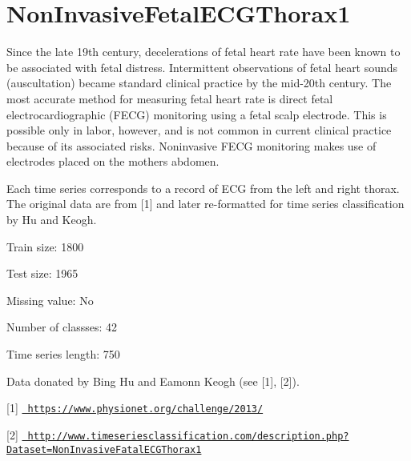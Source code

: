 \chapter{Non\+Invasive\+Fetal\+ECGThorax1}
\hypertarget{md_external_2data_2UCRArchive__2018_2NonInvasiveFetalECGThorax1_2README}{}\label{md_external_2data_2UCRArchive__2018_2NonInvasiveFetalECGThorax1_2README}
\label{md_external_2data_2UCRArchive__2018_2NonInvasiveFetalECGThorax1_2README_autotoc_md156}%
%
 Since the late 19th century, decelerations of fetal heart rate have been known to be associated with fetal distress. Intermittent observations of fetal heart sounds (auscultation) became standard clinical practice by the mid-\/20th century. The most accurate method for measuring fetal heart rate is direct fetal electrocardiographic (FECG) monitoring using a fetal scalp electrode. This is possible only in labor, however, and is not common in current clinical practice because of its associated risks. Noninvasive FECG monitoring makes use of electrodes placed on the mother\textquotesingle{}s abdomen.

Each time series corresponds to a record of ECG from the left and right thorax. The original data are from \mbox{[}1\mbox{]} and later re-\/formatted for time series classification by Hu and Keogh.

Train size\+: 1800

Test size\+: 1965

Missing value\+: No

Number of classses\+: 42

Time series length\+: 750

Data donated by Bing Hu and Eamonn Keogh (see \mbox{[}1\mbox{]}, \mbox{[}2\mbox{]}).

\mbox{[}1\mbox{]} \href{https://www.physionet.org/challenge/2013/}{\texttt{ https\+://www.\+physionet.\+org/challenge/2013/}}

\mbox{[}2\mbox{]} \href{http://www.timeseriesclassification.com/description.php?Dataset=NonInvasiveFatalECGThorax1}{\texttt{ http\+://www.\+timeseriesclassification.\+com/description.\+php?\+Dataset=\+Non\+Invasive\+Fatal\+ECGThorax1}} 